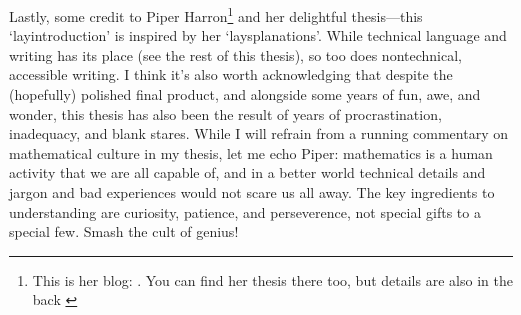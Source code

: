 Lastly, some credit to Piper Harron\footnote{This is her blog: . You can find
  her thesis there too, but details are also in the back \cite{Har15}} and her delightful
thesis---this `layintroduction' is inspired by her `laysplanations'. While
technical language and writing has its place (see the rest of this thesis), so
too does nontechnical, accessible writing. I think it's also worth acknowledging
that despite the (hopefully) polished final product, and alongside some years of
fun, awe, and wonder, this thesis has also been the result of years of
procrastination, inadequacy, and blank stares. While I will refrain from a
running commentary on mathematical culture in my thesis, let me echo Piper:
mathematics is a human activity that we are all capable of, and in a better
world technical details and jargon and bad experiences would not scare us all
away. The key ingredients to understanding are curiosity, patience, and
perseverence, not special gifts to a special few. Smash the cult of genius! 

